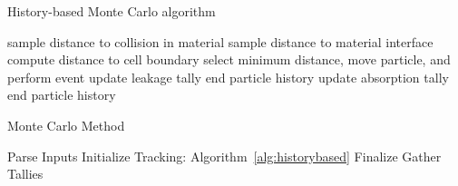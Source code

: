 \begin{algorithm}
\DontPrintSemicolon
\caption{History-based Monte Carlo algorithm}
\label{alg:historybased}
{ 
    {
       sample distance to collision in material\;
       sample distance to material interface\;
       compute distance to cell boundary\;
       select minimum distance, move particle, and perform event\;
       {
          update leakage tally\;
          end particle history\;
       }
       {
          update absorption tally\;
          end particle history\;
       }
    }
}
\end{algorithm}

\begin{algorithm}
\DontPrintSemicolon
\caption{Monte Carlo Method}
\label{alg:mcmethod}
Parse Inputs\;
{
	Initialize\;
	Tracking: Algorithm~\ref{alg:historybased}\;
	Finalize\;
}
Gather Tallies\;
\end{algorithm}




